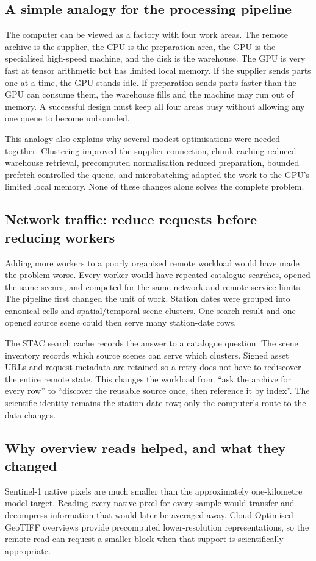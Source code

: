 \documentclass[12pt,a4paper]{report}
\begin{document}
\subsection{A simple analogy for the processing pipeline}
The computer can be viewed as a factory with four work areas. The remote
archive is the supplier, the CPU is the preparation area, the GPU is the
specialised high-speed machine, and the disk is the warehouse. The GPU is very
fast at tensor arithmetic but has limited local memory. If the supplier sends
parts one at a time, the GPU stands idle. If preparation sends parts faster
than the GPU can consume them, the warehouse fills and the machine may run out
of memory. A successful design must keep all four areas busy without allowing
any one queue to become unbounded.

This analogy also explains why several modest optimisations were needed
together. Clustering improved the supplier connection, chunk caching reduced
warehouse retrieval, precomputed normalisation reduced preparation, bounded
prefetch controlled the queue, and microbatching adapted the work to the
GPU's limited local memory. None of these changes alone solves the complete
problem.

\subsection{Network traffic: reduce requests before reducing workers}
Adding more workers to a poorly organised remote workload would have made the
problem worse. Every worker would have repeated catalogue searches, opened the
same scenes, and competed for the same network and remote service limits. The
pipeline first changed the unit of work. Station dates were grouped into
canonical cells and spatial/temporal scene clusters. One search result and one
opened source scene could then serve many station-date rows.

The STAC search cache records the answer to a catalogue question. The scene
inventory records which source scenes can serve which clusters. Signed asset
URLs and request metadata are retained so a retry does not have to rediscover
the entire remote state. This changes the workload from ``ask the archive for
every row'' to ``discover the reusable source once, then reference it by
index''. The scientific identity remains the station-date row; only the
computer's route to the data changes.

\subsection{Why overview reads helped, and what they changed}
Sentinel-1 native pixels are much smaller than the approximately one-kilometre
model target. Reading every native pixel for every sample would transfer and
decompress information that would later be averaged away. Cloud-Optimised
GeoTIFF overviews provide precomputed lower-resolution representations, so the
remote read can request a smaller block when that support is scientifically
appropriate.
\end{document}
